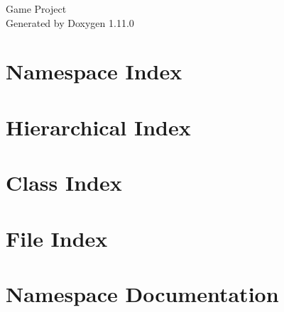 \documentclass[twoside]{book}
\newcommand{\+}{\discretionary{\mbox{\scriptsize$\hookleftarrow$}}{}{}}
\newcommand{\clearemptydoublepage}{%
    \newpage{\pagestyle{empty}\cleardoublepage}%
  }
\begin{document}
  \raggedbottom
    \hypersetup{pageanchor=false,
                bookmarksnumbered=true,
                pdfencoding=unicode
               }
  \begin{titlepage}
  \vspace*{7cm}
  \begin{center}%
  {\Large Game Project}\\
  \vspace*{1cm}
  {\large Generated by Doxygen 1.11.0}\\
  \end{center}
  \end{titlepage}
  \clearemptydoublepage
  \tableofcontents
  \clearemptydoublepage
  \hypersetup{pageanchor=true}
\chapter{Namespace Index}

\chapter{Hierarchical Index}

\chapter{Class Index}

\chapter{File Index}

\chapter{Namespace Documentation}











\end{document}

